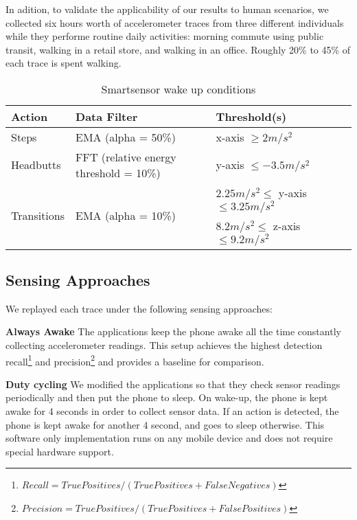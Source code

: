 In adition, to validate the applicability of our results to human
scenarios, we collected six hours worth of accelerometer traces from
three different individuals while they performe routine daily
activities: morning commute using public transit, walking in a retail
store, and walking in an office.  Roughly 20\% to 45\% of each trace
is spent walking.



\begin{table*}[t]
\centering
    \begin{tabular}{|l|l|l|l|}
	\hline
    Action      					& Data Filter 									& Threshold(s) \\ \hline
    Steps     					& EMA (alpha = 50\%) 						& x-axis $\geq 2 m/s^2$ 		\\ \hline
	Headbutts   					& FFT (relative energy threshold = 10\%) 	& y-axis $\leq -3.5 m/s^2$ 		\\ \hline
	\multirow{2}{*}{Transitions} 	& \multirow{2}{*}{EMA (alpha = 10\%)}		& $2.25 m/s^2 \leq$ y-axis $\leq 3.25 m/s^2$ 	\\ 
									&												& $8.2 m/s^2 \leq$ z-axis $\leq 9.2 m/s^2$ 	\\ \hline
    \end{tabular}
	\caption{Smartsensor wake up conditions}
	\label{table:WUCparameters}
\end{table*}


\subsection{Sensing Approaches}

We replayed each trace under the following sensing approaches:

\textbf{Always Awake} The applications keep the phone awake all the
time constantly collecting accelerometer readings.  This setup
achieves the highest detection
recall\footnote{$Recall=TruePositives/(TruePositives+FalseNegatives)$}
and
precision\footnote{$Precision=TruePositives/(TruePositives+FalsePositives)$}
and provides a baseline for comparison.

\textbf{Duty cycling} We modified the applications so that they check
sensor readings periodically and then put the phone to sleep.  On
wake-up, the phone is kept awake for 4 seconds in order to collect
sensor data.  If an action is detected, the phone is kept awake for
another 4 second, and goes to sleep otherwise.  This software only
implementation runs on any mobile device and does not require special
hardware support.


